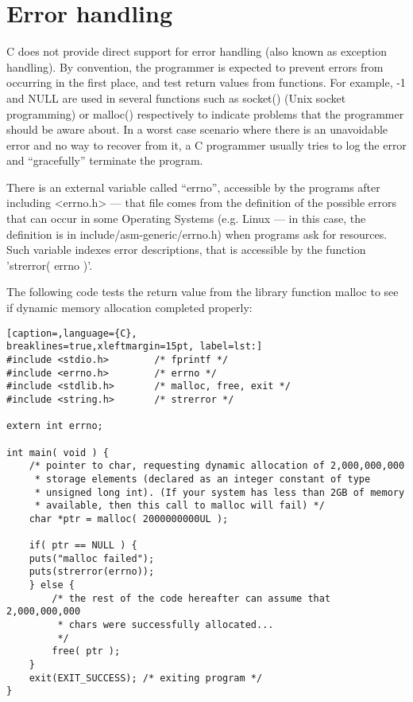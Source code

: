 \section{Error handling}
C does not provide direct support for error handling (also known as exception
handling). By convention, the programmer is expected to prevent errors from
occurring in the first place, and test return values from functions. For
example, -1 and NULL are used in several functions such as socket() (Unix
socket programming) or malloc() respectively to indicate problems that the
programmer should be aware about. In a worst case scenario where there is an
unavoidable error and no way to recover from it, a C programmer usually tries
to log the error and ``gracefully'' terminate the program. 

There is an external variable called ``errno'', accessible by the programs
after including \textless{}errno.h\textgreater{} --- that file comes from the
definition of the possible errors that can occur in some Operating Systems
(e.g. Linux --- in this case, the definition is in include/asm-generic/errno.h)
when programs ask for resources. Such variable indexes error descriptions, that
is accessible by the function 'strerror( errno )'. 

The following code tests the return value from the library function malloc to
see if dynamic memory allocation completed properly:
\lstset{basicstyle=\scriptsize, numbers=left, captionpos=b, tabsize=4}
\begin{lstlisting}[caption=,language={C},
breaklines=true,xleftmargin=15pt, label=lst:]
#include <stdio.h>        /* fprintf */
#include <errno.h>        /* errno */
#include <stdlib.h>       /* malloc, free, exit */
#include <string.h>       /* strerror */

extern int errno;

int main( void ) {
	/* pointer to char, requesting dynamic allocation of 2,000,000,000
	 * storage elements (declared as an integer constant of type
	 * unsigned long int). (If your system has less than 2GB of memory
	 * available, then this call to malloc will fail) */
	char *ptr = malloc( 2000000000UL );
	
	if( ptr == NULL ) {
	puts("malloc failed");
	puts(strerror(errno));
	} else {
		/* the rest of the code hereafter can assume that 2,000,000,000
		 * chars were successfully allocated... 
		 */
		free( ptr );
	}
	exit(EXIT_SUCCESS); /* exiting program */
}
\end{lstlisting}

